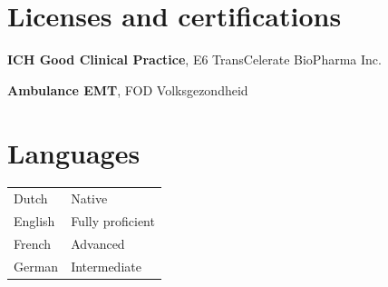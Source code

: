 \documentclass[10pt,a4paper]{article}
\begin{document}
\section*{Licenses and certifications}

\textbf{ICH Good Clinical Practice}, E6 TransCelerate BioPharma Inc.
\smallskip

\textbf{Ambulance EMT}, FOD Volksgezondheid \\

\section*{Languages}
\begin{tabularx}{\linewidth}{@{}p{1.2in} X@{}}
	Dutch   & Native           \\
	English & Fully proficient \\
	French  & Advanced         \\
	German  & Intermediate     \\
\end{tabularx}
\end{document}
